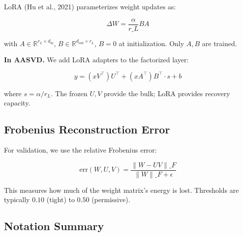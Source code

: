 LoRA (Hu et al., 2021) parameterizes weight updates as:

\[
\Delta W = \frac{\alpha}{r\_L} B A
\tag{3.9}
\]

with $A \in \mathbb{R}^{r_L \times d_\text{in}}$, $B \in \mathbb{R}^{d_\text{out} \times r_L}$, 
$B = 0$ at initialization. Only $A, B$ are trained.

\textbf{In AASVD.} We add LoRA adapters to the factorized layer:

\[
y = (x V^\top) U^\top + (x A^\top) B^\top \cdot s + b
\tag{3.10}
\]

where $s = \alpha / r_L$. The frozen $U, V$ provide the bulk; LoRA provides 
recovery capacity.

\subsection{Frobenius Reconstruction Error}

For validation, we use the relative Frobenius error:

\[
\text{err}(W, U, V) = \frac{\|W - UV\|\_F}{\|W\|\_F + \epsilon}
\tag{3.11}
\]

This measures how much of the weight matrix's energy is lost. Thresholds 
are typically $0.10$ (tight) to $0.50$ (permissive).

\subsection{Notation Summary}
